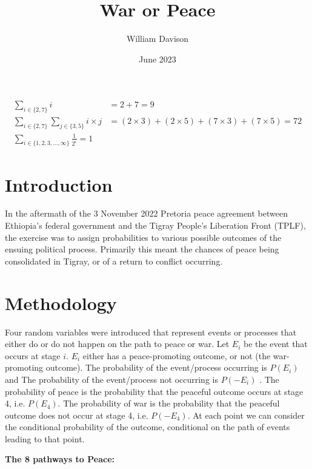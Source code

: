 \documentclass{article}
\title{War or Peace}
\author{William Davison}
\date{June 2023}
\begin{document}
\maketitle

\begin{align*}
\sum_{i \in \{2, 7\}} i &= 2 + 7 = 9 \\
\sum_{i \in \{2, 7\}} \sum_{j \in \{3, 5\}} i \times j &= (2 \times 3) + (2 \times 5) + (7 \times 3) + (7 \times 5) = 72 \\
\sum_{i \in \{1, 2, 3, \ldots, \infty\}} \frac{1}{2^i} = 1
\end{align*}




\section{Introduction}

In the aftermath of the 3 November 2022 Pretoria peace agreement between Ethiopia's federal government and the Tigray People's Liberation Front (TPLF), the exercise was to assign probabilities to various possible outcomes of the ensuing political process.  Primarily this meant the chances of peace being consolidated in Tigray, or of a return to conflict occurring.

\section{Methodology}

 Four random variables were introduced that represent events or processes that either do or do not happen on the path to peace or war. Let $E_i$ be the event that occurs at stage $i$. $E_i$  either has a peace-promoting outcome, or not (the war-promoting outcome). The probability of the event/process occurring is $P(E_i)$ and The probability of the event/process not occurring is $P(-E_i)$ . The probability of peace is the probability that the peaceful outcome occurs at stage 4, i.e. $P(E_4)$. The  probability of war is the probability that the peaceful outcome does not occur at stage 4, i.e. $P(-E_4)$. At each point we can  consider the conditional probability of the  outcome, conditional on the path of events leading to that point.

\textbf{The 8 pathways to Peace:}\\
\end{document}
